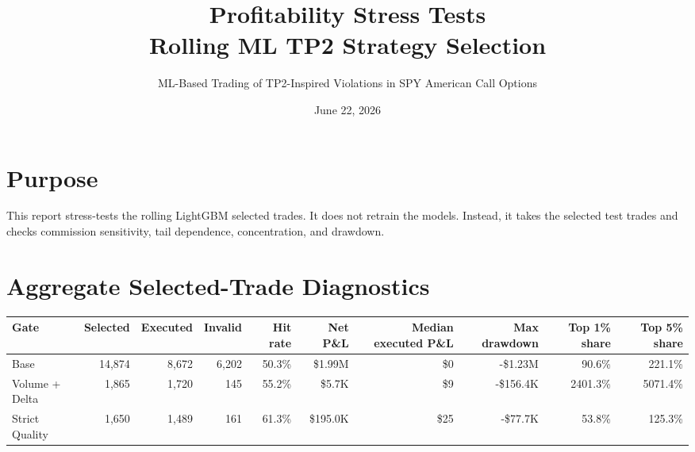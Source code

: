 \documentclass[11pt]{article}
\title{Profitability Stress Tests\\\large Rolling ML TP2 Strategy Selection}
\author{ML-Based Trading of TP2-Inspired Violations in SPY American Call Options}
\date{June 22, 2026}
\begin{document}
\maketitle

\section{Purpose}

This report stress-tests the rolling LightGBM selected trades. It does not
retrain the models. Instead, it takes the selected test trades and checks
commission sensitivity, tail dependence, concentration, and drawdown.

\section{Aggregate Selected-Trade Diagnostics}
\begin{tabular}{lrrrrrrrrr}
\toprule
Gate & Selected & Executed & Invalid & Hit rate & Net P\&L & Median executed P\&L & Max drawdown & Top 1\% share & Top 5\% share \\
\midrule
Base & 14,874 & 8,672 & 6,202 & 50.3\% & \$1.99M & \$0 & -\$1.23M & 90.6\% & 221.1\% \\
Volume + Delta & 1,865 & 1,720 & 145 & 55.2\% & \$5.7K & \$9 & -\$156.4K & 2401.3\% & 5071.4\% \\
Strict Quality & 1,650 & 1,489 & 161 & 61.3\% & \$195.0K & \$25 & -\$77.7K & 53.8\% & 125.3\% \\
\bottomrule
\end{tabular}
\end{document}
